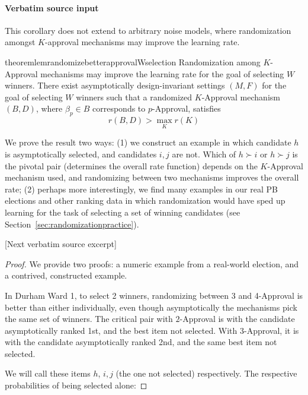 \documentclass[10pt]{article}
\begin{document}
\paragraph{Verbatim source input}
\begin{ReviewVerbatim}
This corollary does not extend to arbitrary noise models, where randomization amongst $K$-approval mechanisms may improve the learning rate.

\begin{restatable}{theorem}{lemrandomizebetterapprovalWselection}
	\label{lem:randomizebetterapproval_Wselection}
			Randomization among $K$-Approval mechanisms may improve the learning rate for the goal of selecting $W$ winners. There exist asymptotically design-invariant settings $(M,F)$ for the goal of selecting $W$ winners such that a randomized $K$-Approval mechanism $(B,D)$, where $\beta_p\in B$ corresponds to $p$-Approval, satisfies \[r(B,D) > \max_K r(K) \]
%
%
\end{restatable}

We prove the result two ways: (1) we construct an example in which candidate $h$ is asymptotically selected, and candidates $i,j$ are not. Which of $h \succ i$ or $h \succ j$ is the pivotal pair (determines the overall rate function) depends on the $K$-Approval mechanism used, and randomizing between two mechanisms improves the overall rate; (2) perhaps more interestingly, we find many examples in our real PB elections and other ranking data in which randomization would have sped up learning for the task of selecting a set of winning candidates (see Section~\ref{sec:randomizationpractice}).

[Next verbatim source excerpt]

\lemrandomizebetterapprovalWselection*
\begin{proof}
We provide two proofs: a numeric example from a real-world election, and a contrived, constructed example.

 In Durham Ward 1, to select 2 winners, randomizing between 3 and 4-Approval is better than either individually, even though asymptotically the mechanisms pick the same set of winners. The critical pair with $2$-Approval is with the candidate asymptotically ranked 1st, and the best item not selected. With $3$-Approval, it is with the candidate asymptotically ranked 2nd, and the same best item not selected.

We will call these items $h$, $i,j$ (the one not selected) respectively. The respective probabilities of being selected alone:


\end{proof}
\end{ReviewVerbatim}
\end{document}
